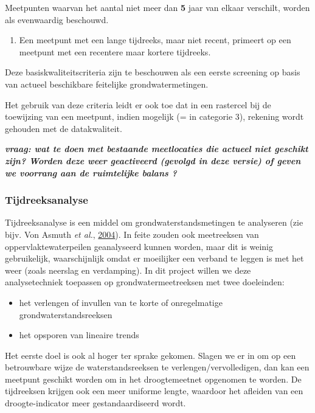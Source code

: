 \documentclass[11pt,]{book}
\providecommand{\tightlist}{%
  \setlength{\itemsep}{0pt}\setlength{\parskip}{0pt}}
\begin{document}
Meetpunten waarvan het aantal niet meer dan \textbf{5} jaar van elkaar
verschilt, worden als evenwaardig beschouwd.

\begin{enumerate}
\def\labelenumi{(\arabic{enumi})}
\setcounter{enumi}{3}
\tightlist
\item
  Een meetpunt met een lange tijdreeks, maar niet recent, primeert op
  een meetpunt met een recentere maar
  \protect\hypertarget{derde-criterium}{}{kortere tijdreeks.}
\end{enumerate}

Deze basiskwaliteitscriteria zijn te beschouwen als een eerste screening
op basis van actueel beschikbare feitelijke grondwatermetingen.

Het gebruik van deze criteria leidt er ook toe dat in een rastercel bij
de toewijzing van een meetpunt, indien mogelijk (= in categorie 3),
rekening wordt gehouden met de datakwaliteit.

\textbf{\emph{vraag: wat te doen met bestaande meetlocaties die actueel
niet geschikt zijn? Worden deze weer geactiveerd (gevolgd in deze
versie) of geven we voorrang aan de ruimtelijke balans ?}}

\subsubsection{Tijdreeksanalyse}\label{tijdreeksanalyse}

Tijdreeksanalyse is een middel om grondwaterstandsmetingen te analyseren
(zie bijv. Von Asmuth \emph{et al.},
\protect\hyperlink{ref-RN877}{2004}). In feite zouden ook meetreeksen
van oppervlaktewaterpeilen geanalyseerd kunnen worden, maar dit is
weinig gebruikelijk, waarschijnlijk omdat er moeilijker een verband te
leggen is met het weer (zoals neerslag en verdamping). In dit project
willen we deze analysetechniek toepassen op grondwatermeetreeksen met
twee doeleinden:

\begin{itemize}
\tightlist
\item
  het verlengen of invullen van te korte of onregelmatige
  grondwaterstandsreeksen
\item
  het opsporen van lineaire trends
\end{itemize}

Het eerste doel is ook al hoger ter sprake gekomen. Slagen we er in om
op een betrouwbare wijze de waterstandsreeksen te
verlengen/vervolledigen, dan kan een meetpunt geschikt worden om in het
droogtemeetnet opgenomen te worden. De tijdreeksen krijgen ook een meer
uniforme lengte, waardoor het afleiden van een droogte-indicator meer
gestandaardiseerd wordt.
\end{document}
